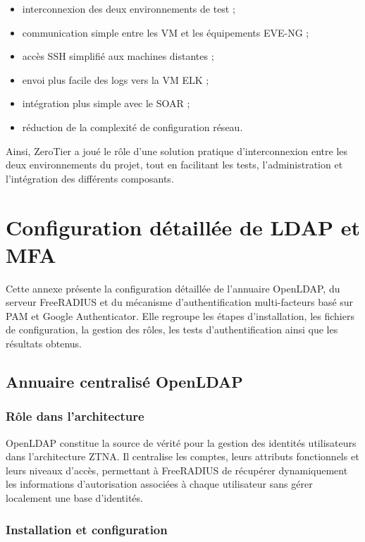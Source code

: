 \documentclass[12pt,a4paper,oneside]{report}
\begin{document}
	\begin{itemize}
		\item interconnexion des deux environnements de test ;
		\item communication simple entre les VM et les équipements EVE-NG ;
		\item accès SSH simplifié aux machines distantes ;
		\item envoi plus facile des logs vers la VM ELK ;
		\item intégration plus simple avec le SOAR ;
		\item réduction de la complexité de configuration réseau.
	\end{itemize}
	
	Ainsi, ZeroTier a joué le rôle d'une solution pratique d'interconnexion entre les deux environnements du projet, tout en facilitant les tests, l'administration et l'intégration des différents composants.
	
	
	\section{Configuration détaillée de LDAP et MFA}
	\label{annexe:ldap-mfa}
	
	Cette annexe présente la configuration détaillée de l'annuaire OpenLDAP, du serveur FreeRADIUS et du mécanisme d'authentification multi-facteurs basé sur PAM et Google Authenticator. Elle regroupe les étapes d'installation, les fichiers de configuration, la gestion des rôles, les tests d'authentification ainsi que les résultats obtenus.
	
	\subsection{Annuaire centralisé OpenLDAP}
	
	\subsubsection{Rôle dans l'architecture}
	
	OpenLDAP constitue la source de vérité pour la gestion des identités
	utilisateurs dans l'architecture ZTNA. Il centralise les comptes, leurs
	attributs fonctionnels et leurs niveaux d'accès, permettant à FreeRADIUS
	de récupérer dynamiquement les informations d'autorisation associées à
	chaque utilisateur sans gérer localement une base d'identités.
	
	\subsubsection{Installation et configuration}
	
\end{document}
